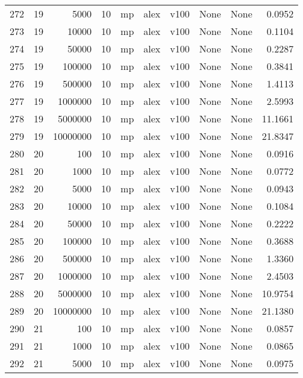 \begin{tabular}{lrrrlllllr}
272 &  19 &      5000 &      10 &   mp &  alex &  v100 &  None &  None &   0.0952 \\
273 &  19 &     10000 &      10 &   mp &  alex &  v100 &  None &  None &   0.1104 \\
274 &  19 &     50000 &      10 &   mp &  alex &  v100 &  None &  None &   0.2287 \\
275 &  19 &    100000 &      10 &   mp &  alex &  v100 &  None &  None &   0.3841 \\
276 &  19 &    500000 &      10 &   mp &  alex &  v100 &  None &  None &   1.4113 \\
277 &  19 &   1000000 &      10 &   mp &  alex &  v100 &  None &  None &   2.5993 \\
278 &  19 &   5000000 &      10 &   mp &  alex &  v100 &  None &  None &  11.1661 \\
279 &  19 &  10000000 &      10 &   mp &  alex &  v100 &  None &  None &  21.8347 \\
280 &  20 &       100 &      10 &   mp &  alex &  v100 &  None &  None &   0.0916 \\
281 &  20 &      1000 &      10 &   mp &  alex &  v100 &  None &  None &   0.0772 \\
282 &  20 &      5000 &      10 &   mp &  alex &  v100 &  None &  None &   0.0943 \\
283 &  20 &     10000 &      10 &   mp &  alex &  v100 &  None &  None &   0.1084 \\
284 &  20 &     50000 &      10 &   mp &  alex &  v100 &  None &  None &   0.2222 \\
285 &  20 &    100000 &      10 &   mp &  alex &  v100 &  None &  None &   0.3688 \\
286 &  20 &    500000 &      10 &   mp &  alex &  v100 &  None &  None &   1.3360 \\
287 &  20 &   1000000 &      10 &   mp &  alex &  v100 &  None &  None &   2.4503 \\
288 &  20 &   5000000 &      10 &   mp &  alex &  v100 &  None &  None &  10.9754 \\
289 &  20 &  10000000 &      10 &   mp &  alex &  v100 &  None &  None &  21.1380 \\
290 &  21 &       100 &      10 &   mp &  alex &  v100 &  None &  None &   0.0857 \\
291 &  21 &      1000 &      10 &   mp &  alex &  v100 &  None &  None &   0.0865 \\
292 &  21 &      5000 &      10 &   mp &  alex &  v100 &  None &  None &   0.0975 \\

\end{tabular}
